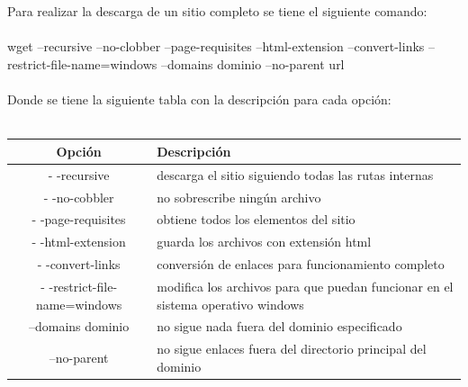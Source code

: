 \documentclass[10pt,a4paper,titlepage]{article}
\begin{document}
	\\
	\\
	Para realizar la descarga de un sitio completo se tiene el siguiente comando:
	\\
	\\
	wget --recursive --no-clobber --page-requisites --html-extension --convert-links --restrict-file-name=windows --domains dominio --no-parent url
	\\
	\\
	Donde se tiene la siguiente tabla con la descripción para cada opción:
	\\
	\\
	\begin{tabular}{|c|p{8cm}|}
		\hline
		Opción & Descripción \\
		\hline
		- -recursive & descarga el sitio siguiendo todas las rutas internas \\
		\hline
		- -no-cobbler & no sobrescribe ningún archivo \\
		\hline 
		- -page-requisites & obtiene todos los elementos del sitio \\
		\hline
		- -html-extension & guarda los archivos con extensión html \\
		\hline
		- -convert-links & conversión de enlaces para funcionamiento completo \\
		\hline
		- -restrict-file-name=windows & modifica los archivos para que puedan funcionar en el sistema operativo windows \\
		\hline
		--domains dominio & no sigue nada fuera del dominio especificado \\
		\hline
		--no-parent & no sigue enlaces fuera del directorio principal del dominio \\
		\hline
	\end{tabular}
	
\end{document}
